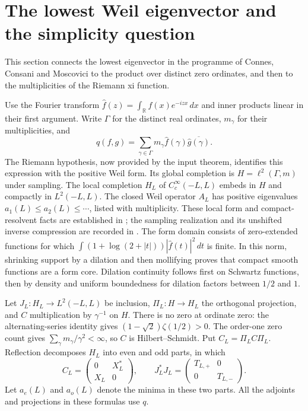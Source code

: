 \section{The lowest Weil eigenvector and the simplicity question}
\label{sec:weil-parity}
This section connects the lowest eigenvector in the programme of Connes,
Consani and Moscovici to the product over distinct zero ordinates, and then
to the multiplicities of the Riemann xi function.

Use the Fourier transform
$\widehat f(z)=\int_{\mathbb R}f(x)e^{-izx}\,dx$ and inner products linear
in their first argument. Write $\Gamma$ for the distinct real ordinates,
$m_\gamma$ for their multiplicities, and
\[
 q(f,g)=\sum_{\gamma\in\Gamma}
 m_\gamma\widehat f(\gamma)\overline{\widehat g(\gamma)}.
\]
The Riemann hypothesis, now provided by the input theorem, identifies
this expression with the positive Weil form. Its global completion is
$H=\ell^2(\Gamma,m)$ under sampling. The local completion $H_L$ of
$C_c^\infty(-L,L)$ embeds in $H$ and compactly in $L^2(-L,L)$.
The closed Weil operator $A_L$ has positive eigenvalues
$a_1(L)\le a_2(L)\le\cdots$, listed with multiplicity.
These local form and compact-resolvent facts are established in
\cite[\S3]{ccm2025}; the sampling realization and its unshifted inverse
compression are recorded in \cite[\S2.3 and Theorem 3.3]{suzuki}.
The form domain consists of zero-extended functions for which
$\int(1+\log(2+|t|))|\widehat f(t)|^2\,dt$ is finite. In this norm,
shrinking support by a dilation and then mollifying proves that compact
smooth functions are a form core. Dilation continuity follows first on
Schwartz functions, then by density and uniform boundedness for dilation
factors between $1/2$ and $1$.

Let $J_L:H_L\to L^2(-L,L)$ be inclusion, $\Pi_L:H\to H_L$ the
orthogonal projection, and $C$ multiplication by $\gamma^{-1}$ on $H$.
There is no zero at ordinate zero: the alternating-series identity gives
$(1-\sqrt2)\zeta(1/2)>0$. The order-one zero count gives
$\sum_\gamma m_\gamma/\gamma^2<\infty$, so $C$ is Hilbert--Schmidt.
Put $C_L=\Pi_LC\Pi_L$. Reflection decomposes $H_L$ into even and odd
parts, in which
\[
 C_L=\begin{pmatrix}0&X_L^*\\X_L&0\end{pmatrix},\qquad
 J_L^*J_L=\begin{pmatrix}T_{L,+}&0\\0&T_{L,-}\end{pmatrix}.
\]
Let $a_e(L)$ and $a_o(L)$ denote the minima in these two parts.
All the adjoints and projections in these formulas use $q$.

